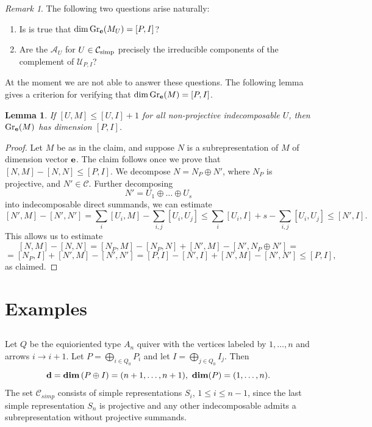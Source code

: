 \documentclass{amsart}
\newcommand{\bd}{\mathbf{d}}
\newcommand{\bdim}{{\rm\bf dim}}
\numberwithin{equation}{section}
\newtheorem{lem}[thm]{Lemma}
\theoremstyle{remark}
\newtheorem{rem}[thm]{Remark}
\begin{document}
\begin{rem}\label{remquestions} The following two questions arise naturally:
\begin{enumerate}
\item Is is true that $\dim {\rm Gr}_{\bf e}(M_U)=[P,I]$?
\item Are the $\mathcal{A}_U$ for $U\in\mathcal{C}_{\rm simp}$ precisely the irreducible components of the complement of $\mathcal{U}_{P,I}$?
\end{enumerate}
At the moment we are not able to answer these questions. The following lemma gives a criterion for verifying that 
$\dim {\rm Gr}_{\bf e}(M) = [P,I]$.
\end{rem}

\begin{lem}\label{lemflatlocus} If $[U,M]\leq [U,I]+1$ for all non-projective indecomposable $U$, then ${\rm Gr}_{\bf e}(M)$ has dimension $[P,I]$.
\end{lem}

\begin{proof} Let $M$ be as in the claim, and suppose $N$ is a subrepresentation of $M$ of dimension vector ${\bf e}$. The claim follows once we prove that $[N,M]-[N,N]\leq [P,I]$. We decompose $N=N_P\oplus N'$, where $N_P$ is projective, and $N'\in\mathcal{C}$. Further decomposing
$$N'=U_1\oplus\ldots\oplus U_s$$
into indecomposable direct summands, we can estimate
$$[N',M]-[N',N']=\sum_i[U_i,M]-\sum_{i,j}[U_i,U_j]\leq \sum_i[U_i,I]+s-\sum_{i,j}[U_i,U_j]\leq [N',I].$$
This allows us to estimate
$$[N,M]-[N,N]=[N_P,M]-[N_P,N]+[N',M]-[N',N_P\oplus N']=$$
$$=[N_P,I]+[N',M]-[N',N']=[P,I]-[N',I]+[N',M]-[N',N']\leq [P,I],$$
as claimed.
\end{proof}



\section{Examples}\label{sec:examples}

\subsection{}
Let $Q$ be the equioriented type $A_n$ quiver with the vertices labeled
by $1,\dots,n$ and arrows $i\to i+1$. Let $P=\bigoplus_{i\in Q_0} P_i$
and let $I=\bigoplus_{j\in Q_0} I_j$. 
Then 
\[
\bd=\mathbf{dim}\, (P\oplus I) = (n+1,\dots,n+1),\ \bdim(P)=(1,\dots,n).
\]
The set $\mathcal{C}_{simp}$ consists of simple representations $S_i$, $1\le i\le n-1$,
since the last simple representation $S_n$ is projective and any other indecomposable
admits a subrepresentation without projective summands. 
\end{document}
